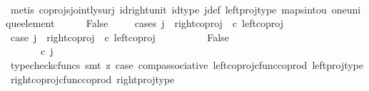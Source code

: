 \begin{isabellebody}
\ \ \ \ \ \ \isamarkupfalse%
\ {\isacharparenleft}{\kern0pt}metis\ coprojs{\isacharunderscore}{\kern0pt}jointly{\isacharunderscore}{\kern0pt}surj\ id{\isacharunderscore}{\kern0pt}right{\isacharunderscore}{\kern0pt}unit{}\ id{\isacharunderscore}{\kern0pt}type\ j{\isacharunderscore}{\kern0pt}def\ left{\isacharunderscore}{\kern0pt}proj{\isacharunderscore}{\kern0pt}type\ maps{\isacharunderscore}{\kern0pt}into{\isacharunderscore}{\kern0pt}{}u{}\ one{\isacharunderscore}{\kern0pt}unique{\isacharunderscore}{\kern0pt}element{\isacharparenright}{\kern0pt}\isanewline
\ \ \ \ \isamarkupfalse%
\ False\isanewline
\ \ \ \ \isamarkupfalse%
{\isacharparenleft}{\kern0pt}cases\ {\isachardoublequoteopen}j\ {\isacharequal}{\kern0pt}\ right{\isacharunderscore}{\kern0pt}coproj\ {\isasymone}\ {\isacharparenleft}{\kern0pt}{\isasymone}{\isasymCoprod}{\isasymone}{\isacharparenright}{\kern0pt}{\isasymcirc}\isactrlsub c\ left{\isacharunderscore}{\kern0pt}coproj\ {\isasymone}\ {\isasymone}{\isachardoublequoteclose}{\isacharparenright}{\kern0pt}\isanewline
\ \ \ \ \ \ \isamarkupfalse%
\ case{}{\isacharcolon}{\kern0pt}\ {\isachardoublequoteopen}j\ {\isacharequal}{\kern0pt}\ right{\isacharunderscore}{\kern0pt}coproj\ {\isasymone}\ {\isacharparenleft}{\kern0pt}{\isasymone}{\isasymCoprod}{\isasymone}{\isacharparenright}{\kern0pt}{\isasymcirc}\isactrlsub c\ left{\isacharunderscore}{\kern0pt}coproj\ {\isasymone}\ {\isasymone}{\isachardoublequoteclose}\isanewline
\ \ \ \ \ \ \isamarkupfalse%
\ False\isanewline
\ \ \ \ \ \ \isamarkupfalse%
\ {\isacharminus}{\kern0pt}\ \isanewline
\ \ \ \ \ \ \ \ \isamarkupfalse%
\ {\isachardoublequoteopen}{\isacharparenleft}{\kern0pt}{\isasymlangle}{\isasymt}{\isacharcomma}{\kern0pt}\ {\isasymt}{\isasymrangle}{\isasymamalg}\ {\isacharparenleft}{\kern0pt}{\isasymlangle}{\isasymf}{\isacharcomma}{\kern0pt}\ {\isasymf}{\isasymrangle}\ {\isasymamalg}{\isasymlangle}{\isasymf}{\isacharcomma}{\kern0pt}\ {\isasymt}{\isasymrangle}{\isacharparenright}{\kern0pt}{\isacharparenright}{\kern0pt}\ {\isasymcirc}\isactrlsub c\ j\ {\isacharequal}{\kern0pt}\ {\isasymlangle}{\isasymf}{\isacharcomma}{\kern0pt}\ {\isasymf}{\isasymrangle}{\isachardoublequoteclose}\isanewline
\ \ \ \ \ \ \ \ \ \ \isamarkupfalse%
\ {\isacharparenleft}{\kern0pt}typecheck{\isacharunderscore}{\kern0pt}cfuncs{\isacharcomma}{\kern0pt}\ smt\ {\isacharparenleft}{\kern0pt}z{}{\isacharparenright}{\kern0pt}\ case{}\ comp{\isacharunderscore}{\kern0pt}associative{}\ left{\isacharunderscore}{\kern0pt}coproj{\isacharunderscore}{\kern0pt}cfunc{\isacharunderscore}{\kern0pt}coprod\ left{\isacharunderscore}{\kern0pt}proj{\isacharunderscore}{\kern0pt}type\ right{\isacharunderscore}{\kern0pt}coproj{\isacharunderscore}{\kern0pt}cfunc{\isacharunderscore}{\kern0pt}coprod\ right{\isacharunderscore}{\kern0pt}proj{\isacharunderscore}{\kern0pt}type{\isacharparenright}{\kern0pt}\isanewline

\end{isabellebody}
